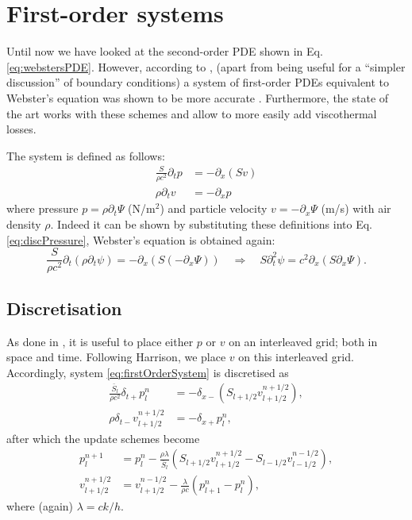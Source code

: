 \documentclass[dvipsnames]{article}
\begin{document}
\section{First-order systems}
Until now we have looked at the second-order PDE shown in Eq. \eqref{eq:webstersPDE}. However, according to \cite{Harrison2018}, (apart from being useful for a ``simpler discussion'' of boundary conditions) a system of first-order PDEs equivalent to Webster's equation was shown to be more accurate \cite{Torin2015}. Furthermore, the state of the art \cite{Harrison2018, Harrison2016} works with these schemes and allow to more easily add viscothermal losses.

The system is defined as follows:
\begin{subequations}\label{eq:firstOrderSystem}
\begin{align}
    \frac{S}{\rho c^2}\partial_t p &= -\partial_x(Sv)\label{eq:discPressure}\\
    \rho\partial_tv &= -\partial_xp\label{eq:discVelocity}
\end{align}
\end{subequations}
where pressure $p = \rho\partial_t \Psi$ (N/m$^2$) and particle velocity $v = -\partial_x\Psi$ (m/s) with air density $\rho$. Indeed it can be shown by substituting these definitions into Eq. \eqref{eq:discPressure}, Webster's equation is obtained again:
\begin{equation}
  \nonumber
        \frac{S}{\rho c^2}\partial_t(\rho \partial_t\psi) = -\partial_x(S(-\partial_x\Psi))\quad \Longrightarrow \quad S\partial_t^2\psi = c^2\partial_x(S\partial_x\Psi).
\end{equation}
\subsection{Discretisation}
As done in \cite{Harrison2018}, it is useful to place either $p$ or $v$ on an interleaved grid; both in space and time. Following Harrison, we place $v$ on this interleaved grid. Accordingly, system \eqref{eq:firstOrderSystem} is discretised as
\begin{subequations}
    \begin{align}
        \frac{\bar S_l}{\rho c^2}\delta_{t+}p_l^n &= -\delta_{x-}(S_{l+1/2}v_{l+1/2}^{n+1/2}),\\
        \rho \delta_{t-}v_{l+1/2}^{n+1/2}&=-\delta_{x+}p_l^n,
    \end{align}
\end{subequations}
after which the update schemes become
\begin{subequations}
    \begin{align}
        p_l^{n+1} &= p_l^n - \frac{\rho \lambda}{\bar{S}_l}(S_{l+1/2}v_{l+1/2}^{n+1/2}-S_{l-1/2}v_{l-1/2}^{n-1/2}),\\
        v_{l+1/2}^{n+1/2} &= v_{l+1/2}^{n-1/2}-\frac{\lambda}{\rho c}(p_{l+1}^n - p_l^n),
    \end{align}
\end{subequations}
where (again) $\lambda = ck/h$.
\end{document}
